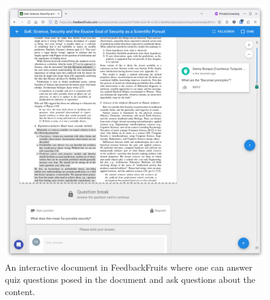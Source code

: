 \begin{frame}
\begin{columns}
\begin{column}{0.5\columnwidth}
{\begin{figure}
          \includegraphics[width=\columnwidth]{figs/fbf-doc-quiz-question.png}
          \caption{%
            An interactive document in FeedbackFruits where one can answer quiz 
            questions posed in the document and ask questions about the 
            content.%
          }
        \end{figure}
      }
    \end{column}
  \end{columns}
\end{frame}

